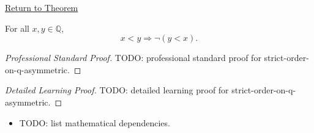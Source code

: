 \newpage
{}
\label{prf:strict-order-on-q-asymmetric}

\begin{remark*}[Return]
\hyperref[thm:strict-order-on-q-asymmetric]{Return to Theorem}
\end{remark*}

\begin{theorem*}
For all $x,y\in\mathbb{Q}$,
\[
x<y \Longrightarrow \neg(y<x).
\]
\end{theorem*}

\begin{proof}[Professional Standard Proof]
\LRAProofBodyStart
TODO: professional standard proof for strict-order-on-q-asymmetric.
\end{proof}

\begin{proof}[Detailed Learning Proof]
\LRAProofBodyStart
TODO: detailed learning proof for strict-order-on-q-asymmetric.
\end{proof}

\begin{remark*}
\end{remark*}

\begin{dependencies}
\begin{itemize}
  \item TODO: list mathematical dependencies.
\end{itemize}
\end{dependencies}

\clearpage
